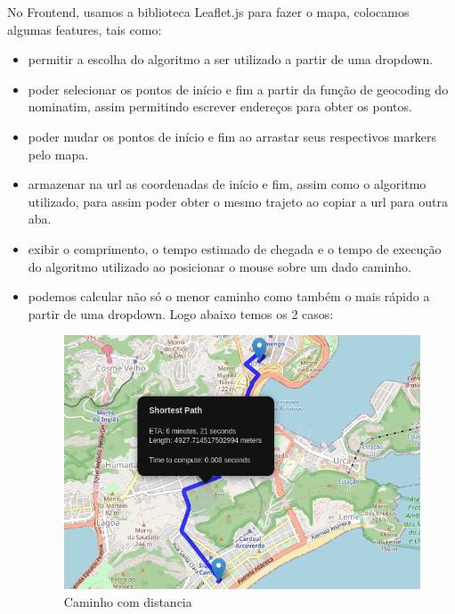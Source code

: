 \documentclass{article}
\begin{document}
No Frontend, usamos a biblioteca Leaflet.js para fazer o mapa, colocamos algumas features, tais como:
\begin{itemize}
    \item permitir a escolha do algoritmo a ser utilizado a partir de uma dropdown.
    
    \item poder selecionar os pontos de início e fim a partir da função de geocoding do nominatim, assim permitindo escrever endereços para obter os pontos.
    
    \item poder mudar os pontos de início e fim ao arrastar seus respectivos markers pelo mapa.
    
    \item armazenar na url as coordenadas de início e fim, assim como o algoritmo utilizado, para assim poder obter o mesmo trajeto ao copiar a url para outra aba.
    
    \item exibir o comprimento, o tempo estimado de chegada e o tempo de execução do algoritmo utilizado ao posicionar o mouse sobre um dado caminho.
    
    \item podemos calcular não só o menor caminho como também o mais rápido a partir de uma dropdown. Logo abaixo temos os 2 casos:
    
\begin{figure}[H]
    \centering
    \includegraphics[scale=0.65]{EDA_path_with_shortest_path.png}
    \caption{Caminho com distancia}
    \label{fig:my_label}
\end{figure}


\end{itemize}
\end{document}
